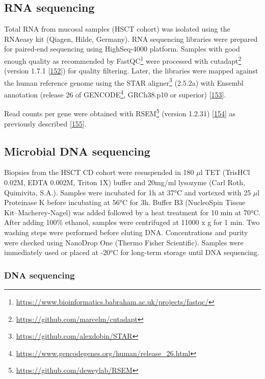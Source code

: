 \documentclass[
  a4paper,
]{book}
\DeclareRobustCommand{\href}[2]{#2\footnote{\url{#1}}}
\begin{document}
\hypertarget{rna-sequencing}{%
\subsection{RNA sequencing}\label{rna-sequencing}}

Total RNA from mucosal samples (HSCT cohort) was isolated using the RNAeasy kit (Qiagen, Hilde, Germany).
RNA sequencing libraries were prepared for paired-end sequencing using HighSeq-4000 platform.
Samples with good enough quality as recommended by \href{https://www.bioinformatics.babraham.ac.uk/projects/fastqc/}{FastQC} were processed with \href{https://github.com/marcelm/cutadapt}{cutadapt} (version 1.7.1 {[}\protect\hyperlink{ref-martin2011}{152}{]}) for quality filtering.
Later, the libraries were mapped against the human reference genome using the \href{https://github.com/alexdobin/STAR}{STAR aligner} (2.5.2a) with Ensembl annotation (\href{https://www.gencodegenes.org/human/release_26.html}{release 26 of GENCODE}, GRCh38.p10 or superior) {[}\protect\hyperlink{ref-dobin2013}{153}{]}.

Read counts per gene were obtained with \href{https://github.com/deweylab/RSEM}{RSEM} (version 1.2.31) {[}\protect\hyperlink{ref-li2011}{154}{]} as previously described {[}\protect\hyperlink{ref-corralizaDifferencesPeripheralTissue}{155}{]}.

\hypertarget{microbial-dna-sequencing}{%
\subsection{Microbial DNA sequencing}\label{microbial-dna-sequencing}}

Biopsies from the HSCT CD cohort were resuspended in 180 \(\mu\)l TET (TrisHCl 0.02M, EDTA 0.002M, Triton 1X) buffer and 20mg/ml lysozyme (Carl Roth, Quimivita, S.A.). Samples were incubated for 1h at 37°C and vortexed with 25 \(\mu\)l Proteinase K before incubating at 56°C for 3h.
Buffer B3 (NucleoSpin Tissue Kit--Macherey-Nagel) was added followed by a heat treatment for 10 min at 70°C.
After adding 100\% ethanol, samples were centrifuged at 11000 x g for 1 min.
Two washing steps were performed before eluting DNA.
Concentrations and purity were checked using NanoDrop One (Thermo Fisher Scientific).
Samples were immediately used or placed at -20°C for long-term storage until DNA sequencing.

\hypertarget{dna-sequencing}{%
\subsubsection{DNA sequencing}\label{dna-sequencing}}
\end{document}
